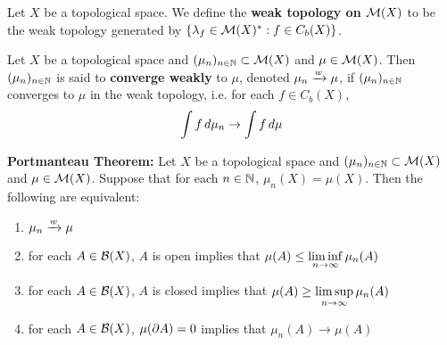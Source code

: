 \documentclass{book}
\begin{document}
	\begin{defn}
		Let $X$ be a topological space. We define the \textbf{weak topology on $\mathcal{M}(X)$} to be the weak topology generated by $\{\lambda_f \in \mathcal{M}(X)^*: f \in C_b(X) \}$. 
	\end{defn}
	
	\begin{defn}
		Let $X$ be a topological space and $(\mu_{n})_{n \in \mathbb{N}} \subset \mathcal{M}(X)$ and $\mu \in \mathcal{M}(X)$. Then $(\mu_{n})_{n \in \mathbb{N}}$ is said to \textbf{converge  weakly} to $\mu$, denoted $\mu_n \xrightarrow{w} \mu$, if $(\mu_{n})_{n \in \mathbb{N}}$ converges to $\mu$ in the weak topology, i.e. for each $f \in C_b(X)$, $$\int f \, d \mu_n \rightarrow \int f \, d \mu$$ 
	\end{defn}	
	
	\begin{ex}\textbf{Portmanteau Theorem:}
		Let $X$ be a topological space and $(\mu_{n})_{n \in \mathbb{N}} \subset \mathcal{M}(X)$ and $\mu \in \mathcal{M}(X)$. Suppose that for each $n \in \mathbb{N}$, $\mu_n(X) = \mu(X)$. Then the following are equivalent:
		\begin{enumerate}
			\item $\mu_n \xrightarrow{w} \mu$
			\item for each $A \in \mathcal{B}(X)$, $A$ is open implies that $\mu(A) \leq \liminf \limits_{n \rightarrow \infty}\limits \mu_n(A) $
			\item for each $A \in \mathcal{B}(X)$, $A$ is closed implies that $\mu(A) \geq \limsup \limits_{n \rightarrow \infty} \limits \mu_n(A) $
			\item for each $A \in \mathcal{B}(X)$, $\mu( \partial A) = 0$ implies that $\mu_n(A) \rightarrow \mu(A) $
		\end{enumerate}
	\end{ex}
	
\end{document}
